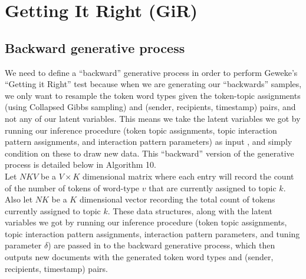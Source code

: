 \documentclass[a4paper]{article}
\begin{document}
   \section{Getting It Right (GiR)}
   \subsection{Backward generative process} \label{subsubsec: Backward Generative Process}
   We need to define a “backward” generative process in order to perform Geweke’s “Getting it Right” test \citep{geweke2004getting} because when we are generating our “backwards” samples, we only want to resample the token word types given the token-topic assignments (using Collapsed Gibbs sampling) and (sender, recipients, timestamp) pairs, and not any of
   our latent variables. This means we take the latent variables we got by running our inference procedure (token topic assignments, topic interaction pattern assignments, and interaction pattern parameters) as input , and simply condition on these to draw new data.
   This “backward” version of the generative process is detailed below in Algorithm 10.\\ \newline
   Let $NKV$ be a $V\times K$ dimensional matrix where each entry will record the count of the number of tokens of word-type $v$ that are currently assigned to topic $k$. Also let $NK$ be a $K$ dimensional vector recording the total count of tokens currently assigned to topic $k$. These
   data structures, along with the latent variables we got by running our inference procedure (token topic assignments, topic interaction pattern assignments, interaction pattern parameters, and tuning parameter $\delta$) are passed in to the backward generative process, which then outputs new documents with the generated token word types and (sender, recipients, timestamp) pairs.
\end{document}
